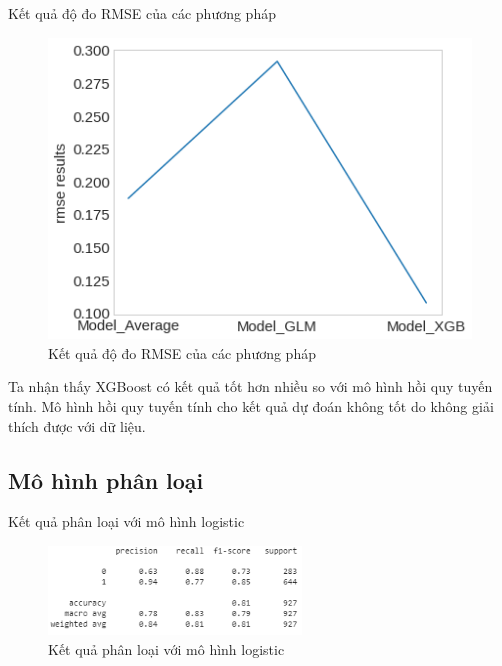 \documentclass[10pt]{beamer}
\theoremstyle{remark}
\theoremstyle{definition}
\begin{document}
\begin{frame}{Kết quả độ đo RMSE của các phương pháp}
	\begin{figure}[h!]
        \centering
        \includegraphics[height=0.6\textheight]{figures/Regression_Model_Result_RMSE.png}
        \caption{Kết quả độ đo RMSE của các phương pháp}
    \end{figure}
	Ta nhận thấy XGBoost có kết quả tốt hơn nhiều so với mô hình hồi quy tuyến tính.
    Mô hình hồi quy tuyến tính cho kết quả dự đoán không tốt do không giải thích được với dữ liệu.
\end{frame}

\subsection{Mô hình phân loại}

\begin{frame}{Kết quả phân loại với mô hình logistic}
	\begin{figure}[h!]
        \centering
        \includegraphics[width=0.6\textwidth]{figures/Logistic_Regression_Report.png}
        \caption{Kết quả phân loại với mô hình logistic}
    \end{figure}
\end{frame}
\end{document}
